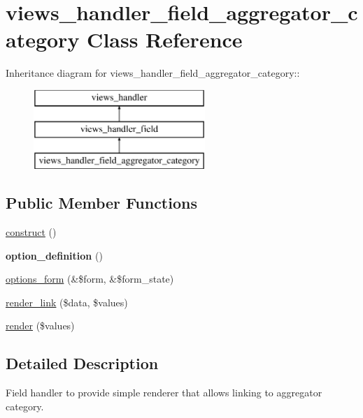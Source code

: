 \hypertarget{classviews__handler__field__aggregator__category}{
\section{views\_\-handler\_\-field\_\-aggregator\_\-category Class Reference}
\label{classviews__handler__field__aggregator__category}
}
Inheritance diagram for views\_\-handler\_\-field\_\-aggregator\_\-category::\begin{figure}[H]
\begin{center}
\leavevmode
\includegraphics[height=3cm]{classviews__handler__field__aggregator__category}
\end{center}
\end{figure}
\subsection*{Public Member Functions}
\begin{DoxyCompactItemize}
\item 
\hyperlink{classviews__handler__field__aggregator__category_ad85fc06aa0e07281e3989dee8bd0c975}{construct} ()
\item 
\hypertarget{classviews__handler__field__aggregator__category_aff9a96fdcd4350cbe9323a9801996016}{
{\bfseries option\_\-definition} ()}
\label{classviews__handler__field__aggregator__category_aff9a96fdcd4350cbe9323a9801996016}

\item 
\hyperlink{classviews__handler__field__aggregator__category_a43be8cbc1313b8b3f51321490d40a914}{options\_\-form} (\&\$form, \&\$form\_\-state)
\item 
\hyperlink{classviews__handler__field__aggregator__category_aed3df98f87fc7d2e61ff3206505e2822}{render\_\-link} (\$data, \$values)
\item 
\hyperlink{classviews__handler__field__aggregator__category_a7e4b0ebcef6f6f5b37480eb15eb378f0}{render} (\$values)
\end{DoxyCompactItemize}


\subsection{Detailed Description}
Field handler to provide simple renderer that allows linking to aggregator category. 

